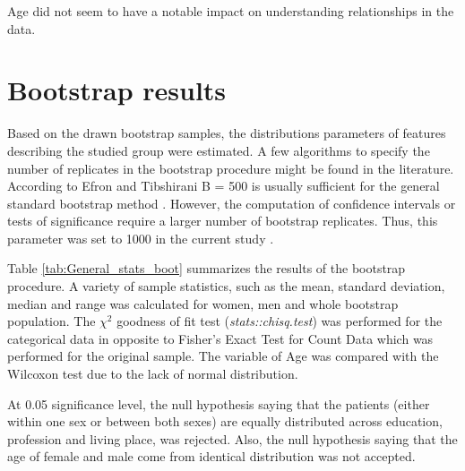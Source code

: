 \documentclass[12pt,a4paper,notitlepage]{report}
\begin{document}
Age did not seem to have a notable impact on understanding relationships in the data.


\section{Bootstrap results}
Based on the drawn bootstrap samples, the distributions parameters of features describing the studied group were estimated. A few algorithms to specify the number of replicates in the bootstrap procedure might be found in the literature. According to Efron and Tibshirani  B = 500 is usually sufficient for the general standard bootstrap method \cite{Efron93}. However, the computation of confidence intervals or tests of significance require a larger number of bootstrap replicates. Thus, this parameter was set to 1000 in the current study \cite{Pattengale10, Davison97}.

Table \ref{tab:General_stats_boot} summarizes the results of the bootstrap procedure. 
A variety of sample statistics, such as the mean, standard deviation, median and range was calculated for women, men and whole bootstrap population.
The $\chi^2 $ goodness of fit test (\textit{stats::chisq.test}) was performed for the categorical data in opposite to Fisher's Exact Test for Count Data which was performed for the original sample.
The variable of Age was compared with the Wilcoxon test due to the lack of normal distribution.

At 0.05 significance level, the null hypothesis saying that the patients (either within one sex or between both sexes) are equally distributed across education, profession and living place, was rejected. Also, the null hypothesis saying that the age of female and male come from identical distribution was not accepted.
\end{document}
